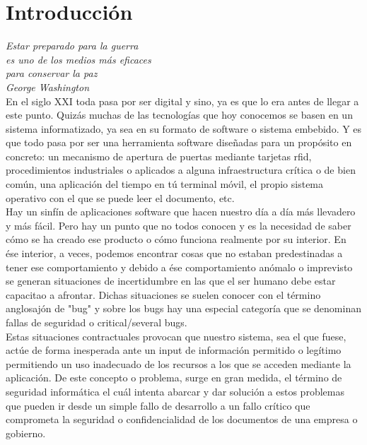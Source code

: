 \chapter{Introducción}
\label{chap:introducción}

\emph{Estar preparado para la guerra\\ es uno de los medios más eficaces\\ para conservar la paz\\ George Washington}\\

En el siglo XXI toda pasa por ser digital y sino, ya es que lo era antes de llegar a este punto. Quizás muchas de las tecnologías que hoy conocemos se basen en un sistema informatizado, ya sea en su formato de software o sistema embebido. Y es que todo pasa por ser una herramienta software diseñadas para un propósito en concreto: un mecanismo de apertura de puertas mediante tarjetas rfid, procedimientos industriales o aplicados a alguna infraestructura crítica o de bien común, una aplicación del tiempo en tú terminal móvil, el propio sistema operativo con el que se puede leer el documento, etc. \\

Hay un sinfín de aplicaciones software que hacen nuestro día a día más llevadero y más fácil. Pero hay un punto que no todos conocen y es la necesidad de saber cómo se ha creado ese producto o cómo funciona realmente por su interior. En ése interior, a veces, podemos encontrar cosas que no estaban predestinadas a tener ese comportamiento y debido a ése comportamiento anómalo o imprevisto se generan situaciones de incertidumbre en las que el ser humano debe estar capacitao a afrontar. Dichas situaciones se suelen conocer con el término anglosajón de "bug" y sobre los bugs hay una especial categoría que se denominan fallas de seguridad o critical/several bugs. \\

Estas situaciones contractuales provocan que nuestro sistema, sea el que fuese, actúe de forma inesperada ante un input de información permitido o legítimo permitiendo un uso inadecuado de los recursos a los que se acceden mediante la aplicación. De este concepto o problema, surge en gran medida, el término de seguridad informática el cuál intenta abarcar y dar solución a estos problemas que pueden ir desde un simple fallo de desarrollo a un fallo crítico que comprometa la seguridad o confidencialidad de los documentos de una empresa o gobierno. \\


